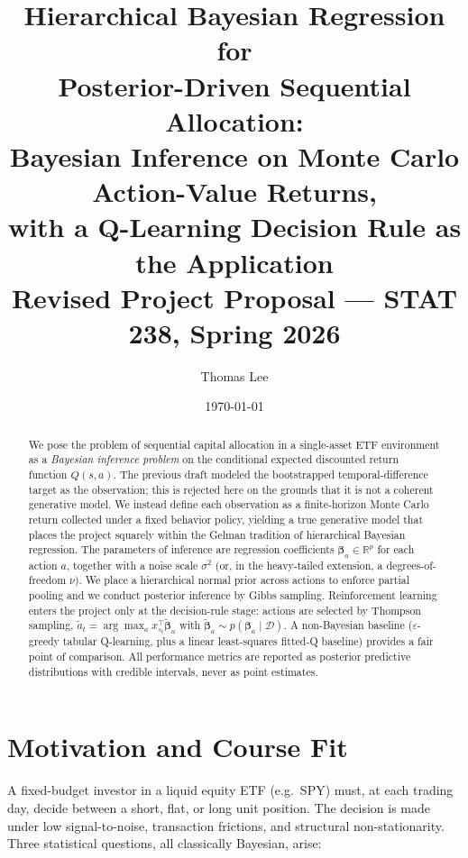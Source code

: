 \documentclass[11pt]{article}
\title{Hierarchical Bayesian Regression for \\
Posterior-Driven Sequential Allocation: \\[0.3em]
\large Bayesian Inference on Monte Carlo Action-Value Returns, \\
with a Q-Learning Decision Rule as the Application \\[0.4em]
\normalsize Revised Project Proposal --- STAT 238, Spring 2026}
\author{Thomas Lee}
\date{\today}
\newcommand{\R}{\mathbb{R}}
\newcommand{\D}{\mathcal{D}}
\begin{document}
\maketitle

\begin{abstract}
\noindent We pose the problem of sequential capital allocation in a single-asset ETF environment as a \emph{Bayesian inference problem} on the conditional expected discounted return function $Q(s,a)$. The previous draft modeled the bootstrapped temporal-difference target as the observation; this is rejected here on the grounds that it is not a coherent generative model. We instead define each observation as a finite-horizon Monte Carlo return collected under a fixed behavior policy, yielding a true generative model that places the project squarely within the Gelman tradition of hierarchical Bayesian regression. The parameters of inference are regression coefficients $\bm{\beta}_a \in \R^p$ for each action $a$, together with a noise scale $\sigma^2$ (or, in the heavy-tailed extension, a degrees-of-freedom $\nu$). We place a hierarchical normal prior across actions to enforce partial pooling and we conduct posterior inference by Gibbs sampling. Reinforcement learning enters the project only at the decision-rule stage: actions are selected by Thompson sampling, $\tilde a_t = \arg\max_a x_{s_t}^\top \tilde{\bm{\beta}}_a$ with $\tilde{\bm{\beta}}_a \sim p(\bm{\beta}_a \mid \D)$. A non-Bayesian baseline ($\varepsilon$-greedy tabular Q-learning, plus a linear least-squares fitted-Q baseline) provides a fair point of comparison. All performance metrics are reported as posterior predictive distributions with credible intervals, never as point estimates.
\end{abstract}

\section{Motivation and Course Fit}

A fixed-budget investor in a liquid equity ETF (e.g.\ SPY) must, at each trading day, decide between a short, flat, or long unit position. The decision is made under low signal-to-noise, transaction frictions, and structural non-stationarity. Three statistical questions, all classically Bayesian, arise:
\end{document}

